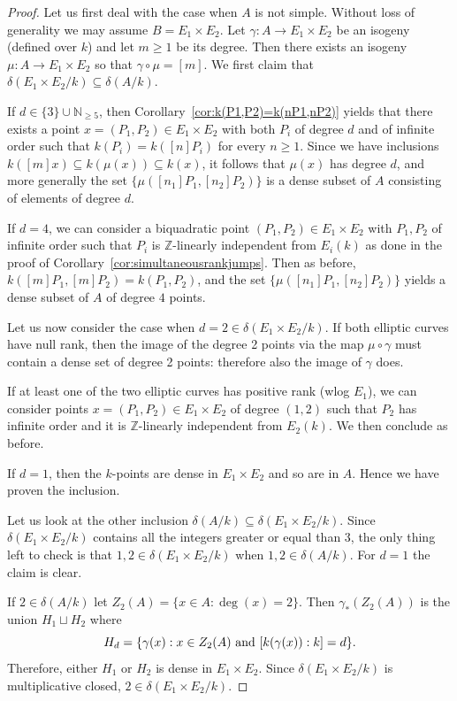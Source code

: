 \documentclass[a4paper,11pt]{amsart}
\theoremstyle{plain}
\theoremstyle{remark}
\newcommand{\nn}{\mathbb{N}}
\newcommand{\bZ}{\mathbb{Z}}
\newcommand{\dendegs}{\delta}
\begin{document}
\begin{proof}
Let us first deal with the case when $A$ is not simple. 
Without loss of generality we may assume $B=E_1\times E_2$.
Let $\gamma:A\to E_1\times E_2$ be an isogeny (defined over $k$) and let $m\geq 1$ be its degree. 
Then there exists an isogeny $\mu:A\to E_1\times E_2$ so that $\gamma\circ\mu=[m]$. We first claim that $\dendegs(E_1\times E_2/k)\subseteq\dendegs(A/k)$. 
    
If $d\in\{3\}\cup\nn_{\geq 5}$, then Corollary~\ref{cor:k(P1,P2)=k(nP1,nP2)} yields that there exists a point $x=(P_1,P_2)\in E_1\times E_2$ with both $P_i$ of degree $d$ and of infinite order such that $k(P_i)=k([n]P_i)$ for every $n\geq 1$. Since  we have inclusions $k([m]x)\subseteq k(\mu(x))\subseteq k(x)$, it follows that $\mu(x)$ has degree $d$, and more generally the set $\{\mu([n_1]P_1, [n_2]P_2)\}$ is a dense subset of $A$ consisting of elements of degree $d$. 
    
If $d=4$, we can consider a biquadratic point $(P_1,P_2)\in E_1\times E_2$ with $P_1, P_2$ of infinite order such that $P_i$ is $\bZ$-linearly independent from $E_i(k)$ as done in the proof of Corollary~\ref{cor:simultaneousrankjumps}.
Then as before, $k([m]P_1,[m]P_2)=k(P_1,P_2)$, and the set $\{ \mu( [n_1]P_1, [n_2]P_2 )  \}$ yields a dense subset of $A$ of degree $4$ points.

Let us now consider the case when $d=2\in \dendegs(E_1\times E_2/k)$.
If both elliptic curves have null rank, then the image of the degree 2 points via the map $\mu\circ \gamma$ must contain a dense set of degree 2 points: therefore also the image of $\gamma$ does.

If at least one of the two elliptic curves has positive rank (wlog $E_1$), we can consider points $x=(P_1,P_2) \in E_1\times E_2$ of degree $(1,2)$ such that $P_2$ has infinite order and it is $\bZ$-linearly independent from $E_2(k)$.
We then conclude as before.

If $d=1$, then the $k$-points are dense in $E_1\times E_2$ and so are in $A$. Hence we have proven the inclusion.

Let us look at the other inclusion  $\dendegs(A/k)\subseteq\dendegs(E_1\times E_2/k)$. 
Since $\dendegs(E_1\times E_2/k)$ contains all the integers greater or equal than 3, the only thing left to check is that $1,2\in\dendegs(E_1\times E_2/k)$ when $1,2\in\dendegs(A/k)$. 
For $d=1$ the claim is clear.

If $2\in \dendegs(A/k)$ let $Z_2(A) = \{ x\in A : \deg(x)=2 \}$.
Then $\gamma_*(Z_2(A))$ is the union $H_1\sqcup H_2$ where
    \[
    H_d = \{ \gamma(x) : x\in Z_2(A) \textup{ and } [k(\gamma(x)):k]=d  \}.
    \]
    Therefore, either $H_1$ or $H_2$ is dense in $E_1\times E_2$. 
    Since $\dendegs(E_1\times E_2/k)$ is multiplicative closed, $2\in \dendegs(E_1\times E_2/k)$. 
 

\end{proof}
\end{document}
